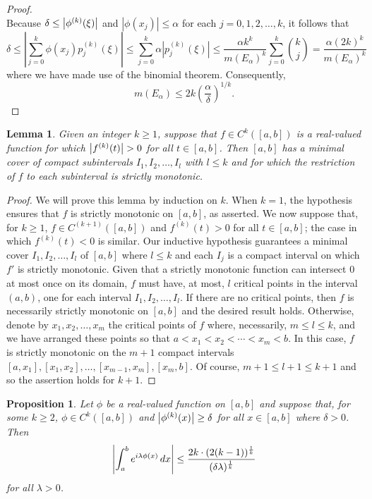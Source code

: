 \documentclass[11pt]{article}
\newtheorem{lemma}[theorem]{Lemma}
\newtheorem{proposition}[theorem]{Proposition}
\newcommand{\f}[2]{\frac{#1}{#2}}
\begin{document}
\begin{proof}
\begin{equation*}
\end{equation*}
Because $\delta\leq \abs{\phi^{(k)}(\xi)}$ and $|\phi(x_j)|\leq \alpha$ for each $j=0,1,2,\dots,k$, it follows that
\begin{equation*}
\delta\leq \left|\sum_{j=0}^k \phi(x_j)p_j^{(k)}(\xi)\right|\leq \sum_{j=0}^k\alpha|p_j^{(k)}(\xi)|\leq \frac{\alpha k^k}{m(E_\alpha)^k}\sum_{j=0}^k{k\choose j}=\frac{\alpha (2k)^k}{m(E_\alpha)^k}
\end{equation*}
where we have made use of the binomial theorem. Consequently,
\begin{equation*}
    m(E_\alpha)\leq 2k\left(\frac{\alpha}{\delta}\right)^{1/k}.
\end{equation*}
\end{proof}

\begin{lemma}\label{lem:CriticalPoints} Given an integer $k \geq 1$, suppose that $f \in C^k([a,b])$ is a real-valued function for which $\abs{f^{(k)}(t)} > 0$ for all $t\in [a,b]$. Then $[a,b]$ has a minimal cover of compact subintervals $I_1,I_2,\dots,I_l$ with $l\leq k$ and for which the restriction of $f$ to each subinterval is strictly monotonic.
\end{lemma}


\begin{proof}
We will prove this lemma by induction on $k$. When $k=1$, the hypothesis ensures that $f$ is strictly monotonic on $[a,b]$, as asserted. We now suppose that, for $k\geq 1$, $f\in C^{(k+1)}([a,b])$ and $f^{(k)}(t)>0$ for all $t\in [a,b]$; the case in which $f^{(k)}(t)<0$ is similar. Our inductive hypothesis guarantees a minimal cover $I_1,I_2,\dots,I_l$ of $[a,b]$ where $l\leq k$ and each $I_j$ is a compact interval on which $f'$ is strictly monotonic. Given that a strictly monotonic function can intersect $0$ at most once on its domain, $f$ must have, at most, $l$ critical points in the interval $(a,b)$, one for each interval $I_1,I_2,\dots,I_l$. If there are no critical points, then $f$ is necessarily strictly monotonic on $[a,b]$ and the desired result holds. Otherwise, denote by $x_1,x_2,\dots,x_m$ the critical points of $f$ where, necessarily, $m\leq l\leq k$, and we have arranged these points so that $a<x_1<x_2<\cdots<x_m<b$. In this case, $f$ is strictly monotonic on the $m+1$ compact intervals $[a,x_1],[x_1,x_2],\dots,[x_{m-1},x_m],[x_m,b]$. Of course, $m+1\leq l+1\leq k+1$ and so the assertion holds for $k+1$.
\end{proof}

\begin{proposition}\label{prop:NoPsi}
Let $\phi$ be a real-valued function on $[a,b]$ and suppose that, for some $k\geq 2$, $\phi\in C^k([a,b])$ and $\abs{\phi^{(k)}(x)} \geq \delta$ for all $x\in [a,b]$ where $\delta>0$. Then
\begin{equation*}
    \abs{\int_a^b e^{i\lambda \phi(x)} \,dx} \leq \f{2k\cdot (2(k-1))^{\f{1}{k}}}{(\delta\lambda)^{\f{1}{k}}}
\end{equation*}
for all $\lambda>0$.
\end{proposition}
\end{document}
